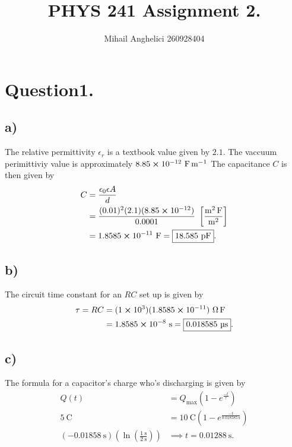 \documentclass[
	12pt,
	]{article}
\title{PHYS 241 Assignment 2.}
\author{Mihail Anghelici 260928404}
\date{\empty}
\theoremstyle{definition}
\theoremstyle{definition}
\theoremstyle{definition}
\theoremstyle{definition}
\theoremstyle{definition}
\theoremstyle{example}
\theoremstyle{note}
\theoremstyle{remark}
\theoremstyle{example}
\begin{document}
	\maketitle
	
	\section*{Question1.}
		\subsection*{a) }
			The relative permittivity $\epsilon_{r}$ is a textbook value given by $2.1$. The vaccuum perimittiviy value is approximately $8.85 \cross 10^{-12} \ \si{\farad\per\meter}$
			The capacitance $C$ is then given by 
			\begin{align*}
				C &= \frac{\epsilon_{0} \epsilon A}{d}\\
				&= \frac{(0.01)^{2}(2.1)(8.85 \cross 10^{-12})}{0.0001} \ \left[\frac{\si{\meter\squared\farad}}{\si{\meter\squared}}\right] \\
				&= 1.8585 \cross 10^{-11} \ \si{\farad} = \boxed{18.585 \ \si{\pico\farad}}.
			\end{align*}
		\subsection*{b) }
			The circuit time constant for an $RC$ set up is given by 
			\begin{align*}
				\tau = RC &= (1\cross 10^{3})(1.8585 \cross 10^{-11}) \ \si{\ohm\farad} \\
				&= 1.8585 \cross 10^{-8} \ \si{\second} = \boxed{0.018585 \ \si{\micro\second}}.
			\end{align*}
		\subsection*{c) }
			The formula for a capacitor's charge who's discharging is given by 
			\begin{align*}
				Q(t) &= Q_{\text{max}}\left(1-e^{\frac{-t}{\tau}}\right) \\
				5 \ \si{\coulomb} &= 10 \ \si{\coulomb}(1-e^{\frac{-t}{0.018585 \ \si{\second}}})\\
				(-0.01858 \ \si{\second})\left(\ln(\frac{1 \ \si{\second}}{2 \ \si{\second}})\right) &\implies \boxed{t = 0.01288 \ \si{\second}}.
			\end{align*}
\end{document}

